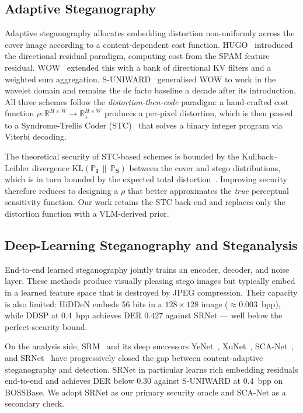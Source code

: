 \documentclass[10pt,a4paper]{article}
\newcommand{\R}{\mathbb{R}}
\newcommand{\cover}{\mathbf{I}}
\newcommand{\stego}{\mathbf{S}}
\newcommand{\KL}{\mathrm{KL}}
\newcommand{\Pc}{\mathbb{P}}
\begin{document}
\subsection{Adaptive Steganography}
\label{sec:related-adaptive}

Adaptive steganography allocates embedding distortion non-uniformly
across the cover image according to a content-dependent cost function.
HUGO~\cite{pevny2010hugo} introduced the directional residual paradigm,
computing cost from the SPAM feature residual. WOW~\cite{holub2012wow}
extended this with a bank of directional KV filters and a weighted
sum aggregation. S-UNIWARD~\cite{holub2014suniv} generalised WOW to
work in the wavelet domain and remains the de facto baseline a decade
after its introduction. All three schemes follow the
\emph{distortion-then-code} paradigm: a hand-crafted cost function
$\rho: \R^{H \times W} \to \R_+^{H \times W}$ produces a per-pixel
distortion, which is then passed to a Syndrome-Trellis Coder
(STC)~\cite{filler2011stc} that solves a binary integer program via
Viterbi decoding.

The theoretical security of STC-based schemes is bounded by the
Kullback--Leibler divergence $\KL(\Pc_{\cover} \,\|\, \Pc_{\stego})$
between the cover and stego distributions, which is in turn bounded by
the expected total distortion~\cite{filler2011stc}. Improving security
therefore reduces to designing a $\rho$ that better approximates the
\emph{true} perceptual sensitivity function. Our work retains the STC
back-end and replaces only the distortion function with a VLM-derived
prior.

\subsection{Deep-Learning Steganography and Steganalysis}
\label{sec:related-dl}

End-to-end learned steganography \cite{zhu2019hidden,
zhang2019steganogan, zhou2022ddsp} jointly trains an encoder, decoder,
and noise layer. These methods produce visually pleasing stego images
but typically embed in a learned feature space that is destroyed by
JPEG compression. Their capacity is also limited: HiDDeN embeds 56
bits in a $128{\times}128$ image ($\approx 0.003$~bpp), while DDSP at
0.4~bpp achieves DER 0.427 against SRNet --- well below the
perfect-security bound.

On the analysis side, SRM~\cite{friedman2014srm} and its deep
successors YeNet~\cite{ye2017yenet}, XuNet~\cite{xu2016xunet},
SCA-Net~\cite{xu2017scanet}, and SRNet~\cite{boroumand2019srnet} have
progressively closed the gap between content-adaptive steganography and
detection. SRNet in particular learns rich embedding residuals
end-to-end and achieves DER below 0.30 against S-UNIWARD at 0.4~bpp on
BOSSBase. We adopt SRNet as our primary security oracle and SCA-Net as
a secondary check.
\end{document}

